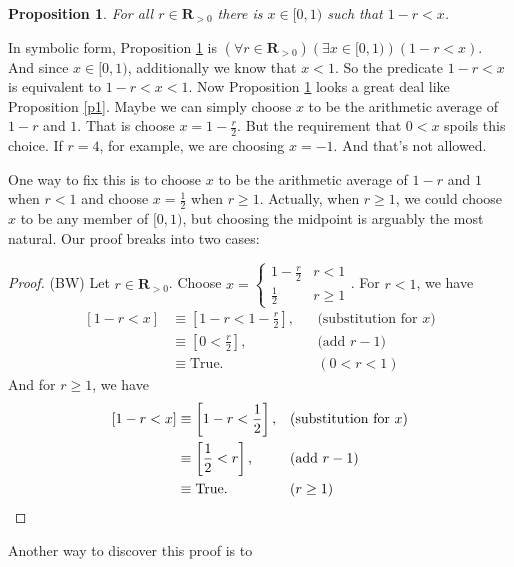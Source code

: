\documentclass[12pt,fleqn,answers]{article}
\newcommand{\reals}{\mathbf{R}}
\newcommand{\true}{\mathrm{True}}
\newenvironment{myproof}
  {\begin{shaded}\begin{proof}}
  {\end{proof}\end{shaded}}
\newtheorem{prop}{Proposition}
\begin{document}
\begin{prop} 
     For all $r \in \reals_{>0}$ there is $x \in [0,1)$ such that $1-r < x$.  \label{p2}
\end{prop}

\noindent In symbolic form, Proposition \ref{p2} is $\left(\forall r  \in \reals_{>0} \right) \left(\exists x \in [0,1)\right) \left (1-r  < x \right)$.
And since $x \in [0,1)$, additionally we know that $x < 1$.  So the predicate $1-r  < x$ is equivalent to $1-r  < x  < 1$. Now Proposition \ref{p2}
looks a great deal like  Proposition \ref{p1}. Maybe we can simply choose $x$ to be the arithmetic average of $1-r$ and $1$. That is
choose $x = 1 - \frac{r}{2}$.  But the requirement that $0 < x$ spoils this choice. If $r = 4$, for example, we are choosing $x = -1$. And that's 
not allowed.    

One way to fix this is to choose $x$ to be the arithmetic average of $1-r$ and $1$ when $r < 1$ and choose $x = \frac{1}{2}$ when $r \geq 1$. 
Actually, when $r \geq 1$, we could choose $x$ to be any member of $[0,1)$, but choosing the midpoint is arguably the most natural.
Our proof breaks into two cases:
     
      \begin{myproof} (BW) Let $r \in \reals_{>0}$. Choose $x = \begin{cases} 1 - \frac{r}{2}  & r < 1 \\ \frac{1}{2} & r \geq 1 \end{cases}$. For $r < 1$, we have
      \begin{align*}
       \left[1-r < x \right] &\equiv \left[1-r < 1 - \frac{r}{2}  \right], && \text{(substitution for $x$)} \\
                                  &\equiv  \left[0 <  \frac{r}{2}  \right], && \text{(add $r-1$)} \\
                                  &\equiv \true.   &&(0 < r < 1)
      \end{align*}
      And for $r \geq 1$, we have
       \begin{align*}
       \left[1-r < x \right] &\equiv \left[1-r < \frac{1}{2}  \right], && \text{(substitution for $x$)} \\
                                  &\equiv  \left[\frac{1}{2}  <  r  \right], && \text{(add $r-1$)} \\
                                  &\equiv \true.   &&(r \geq 1) \qedhere
      \end{align*}
      \end{myproof}
     Another way to discover this proof is to 
\end{document}
